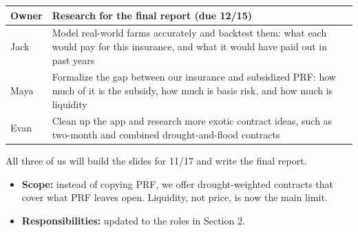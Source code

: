 \documentclass[10pt]{article}
\newcommand{\head}[1]{\par\vspace{4pt}{\large\bfseries #1}\par\vspace{1pt}}
\begin{document}
{\small
\begin{tabularx}{\textwidth}{@{}lY@{}}
\toprule
Owner & Research for the final report (due 12/15) \\
\midrule
Jack & Model real-world farms accurately and backtest them: what each would
  pay for this insurance, and what it would have paid out in past years \\
Maya & Formalize the gap between our insurance and subsidized PRF: how much
  of it is the subsidy, how much is basis risk, and how much is liquidity \\
Evan & Clean up the app and research more exotic contract ideas, such as
  two-month and combined drought-and-flood contracts \\
\bottomrule
\end{tabularx}
}
\par\vspace{1pt}
All three of us will build the slides for 11/17 and write the final report.

\head{3. Refinements to our plan}
\begin{itemize}
  \item \textbf{Scope:} instead of copying PRF, we offer drought-weighted
    contracts that cover what PRF leaves open. Liquidity, not price, is now
    the main limit.
  \item \textbf{Responsibilities:} updated to the roles in Section 2.
\end{itemize}
\end{document}
